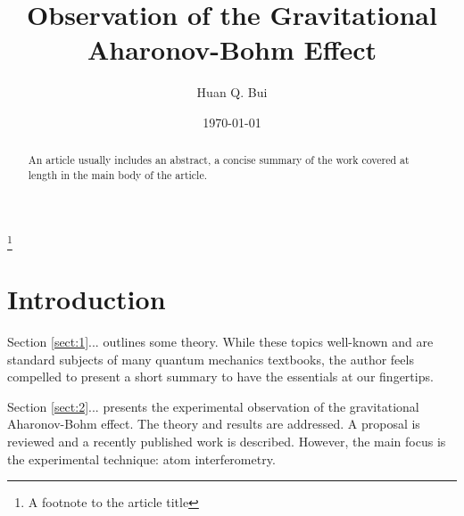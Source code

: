 \documentclass[reprint,
nofootinbib,
amsmath,amssymb,
aps]{revtex4-1}
\begin{document}
	
	
	

\title{Observation of the Gravitational Aharonov-Bohm Effect}
\thanks{A footnote to the article title}%
\author{Huan Q. Bui}
\date{\today}


\begin{abstract}
	An article usually includes an abstract, a concise summary of the work
	covered at length in the main body of the article. 
\end{abstract}

\maketitle




\section{Introduction}



Section \ref{sect:1}... outlines some theory. While these topics well-known and are standard subjects of many quantum mechanics textbooks, the author feels compelled to present a short summary to have the essentials at our fingertips. 


Section \ref{sect:2}... presents the experimental observation of the gravitational Aharonov-Bohm effect. The theory and results are addressed. A proposal is reviewed and a recently published work is described. However, the main focus is the experimental technique: atom interferometry. 
\end{document}
